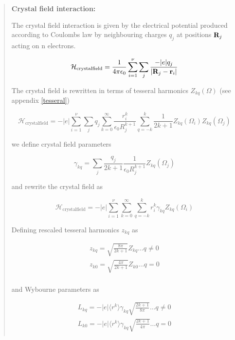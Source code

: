 \begin{quotation}
\item[\bf Crystal field interaction:]

The crystal field interaction is given by the electrical potential produced according 
to Coulombs law by neighbouring charges $q_j$ at positions $\mathbf R_j$ acting on
n electrons.
 
\begin{equation}\label{crystal field}
\mathcal H_{\mathrm{crystalfield}}=\frac{1}{4\pi \epsilon_0}\sum_{i=1}^\nu \sum_j \frac{-|e|q_j}{|\mathbf R_j - \mathbf r_i|}
\end{equation}

The crystal field is rewritten in terms of tesseral harmonics $Z_{kq}(\Omega)$ (see appendix \ref{tesseral})

\begin{equation}
\mathcal H_{\mathrm{crystalfield}}=-|e|\sum_{i=1}^\nu \sum_j q_j \sum_{k=0}^{\infty}\frac{r_i^k}{\epsilon_0 R_j^{k+1}} \sum_{q=-k}^k \frac{1}{2k+1} %
Z_{kq}(\Omega_i)Z_{kq}(\Omega_j)
\end{equation}

we define crystal field parameters 

\begin{equation}
\gamma_{kq}=\sum_j \frac{q_j}{2k+1}\frac{1}{\epsilon_0R_j^{k+1}}Z_{kq}(\Omega_j)
\end{equation}

and rewrite the crystal field as

\begin{equation}
\mathcal H_{\mathrm{crystalfield}}=-|e| \sum_{i=1}^\nu \sum_{k=0}^{\infty} \sum_{q=-k}^k r_i^k \gamma_{kq}Z_{kq}(\Omega_i)
\end{equation}

Defining rescaled tesseral harmonics $z_{kq}$ as

\begin{eqnarray}
z_{kq}=\sqrt{\frac{8\pi}{2k+1}}Z_{kq} \dots q\neq 0 \\
z_{k0}=\sqrt{\frac{4\pi}{2k+1}}Z_{k0} \dots q=0 \\
\end{eqnarray}

and Wybourne parameters as

\begin{eqnarray}
L_{kq}=-|e|\langle r^k \rangle \gamma_{kq}\sqrt{\frac{2k+1}{8\pi}} \dots q\neq 0 \\
L_{k0}=-|e|\langle r^k \rangle \gamma_{kq}\sqrt{\frac{2k+1}{4\pi}} \dots q= 0 \\
\end{eqnarray}


\end{quotation}
